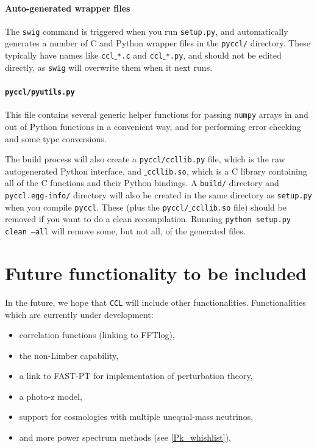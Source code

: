 \documentclass[\docopts]{\docclass}
\begin{document}
\paragraph{Auto-generated wrapper files} The {\tt swig} command is triggered when you run {\tt setup.py}, and automatically generates a number of C and Python wrapper files in the {\tt pyccl/} directory. These typically have names like {\tt ccl$\_$*.c} and {\tt ccl$\_$*.py}, and should not be edited directly, as {\tt swig} will overwrite them when it next runs.

\paragraph{{\tt pyccl/pyutils.py}} This file contains several generic helper functions for passing {\tt numpy} arrays in and out of Python functions in a convenient way, and for performing error checking and some type conversions.

The build process will also create a {\tt pyccl/ccllib.py} file, which is the raw autogenerated Python interface, and {\tt $\_$ccllib.so}, which is a C library containing all of the C functions and their Python bindings. A {\tt build/} directory and {\tt pyccl.egg-info/} directory will also be created in the same directory as {\tt setup.py} when you compile {\tt pyccl}. These (plus the {\tt pyccl/$\_$ccllib.so} file) should be removed if you want to do a clean recompilation. Running {\tt python setup.py clean --all} will remove some, but not all, of the generated files.


\section{Future functionality to be included}
\label{sec:future}

In the future, we hope that {\tt CCL} will include other functionalities. Functionalities which are currently under development:
\begin{itemize}
	\item correlation functions (linking to FFTlog),
	\item the non-Limber capability,
	\item a link to FAST-PT \citep{FASTPT} for implementation of perturbation theory,
	\item a photo-z model,
	\item support for cosmologies with multiple unequal-mass neutrinos,
	\item and more power spectrum methods (see \ref{Pk_whishlist}).
\end{itemize}
\end{document}

